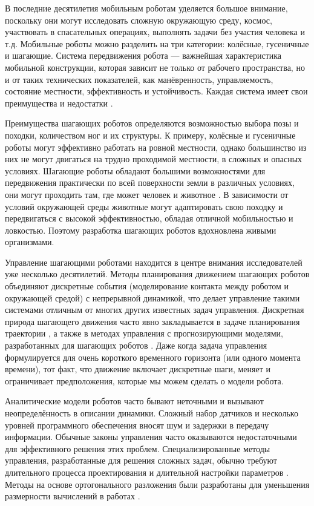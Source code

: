 {\actuality} 

В последние десятилетия мобильным роботам уделяется большое внимание, поскольку они могут исследовать сложную окружающую среду, космос, участвовать в спасательных операциях, выполнять задачи без участия человека и т.д. Мобильные роботы можно разделить на три категории: колёсные, гусеничные и шагающие. Система передвижения робота --- важнейшая характеристика мобильной конструкции, которая зависит не только от рабочего пространства, но и от таких технических показателей, как манёвренность, управляемость, состояние местности, эффективность и устойчивость. Каждая система имеет свои преимущества и недостатки \cite{zhong2019}.

Преимущества шагающих роботов определяются возможностью выбора позы и походки, количеством ног и их структуры. К примеру, колёсные и гусеничные роботы могут эффективно работать на ровной местности, однако большинство из них не могут двигаться на трудно проходимой местности, в сложных и опасных условиях. Шагающие роботы обладают большими возможностями для передвижения практически по всей поверхности земли в различных условиях, они могут проходить там, где может человек и животное \cite{Silva2012}. В зависимости от условий окружающей среды животные могут адаптировать свою походку и передвигаться с высокой эффективностью, обладая отличной мобильностью и ловкостью. Поэтому разработка шагающих роботов вдохновлена живыми организмами.

Управление шагающими роботами находится в центре внимания исследователей уже несколько десятилетий. Методы планирования движением шагающих роботов объединяют дискретные события (моделирование контакта между роботом и окружающей средой) с непрерывной динамикой, что делает управление такими системами отличным от многих других известных задач управления. Дискретная природа шагающего движения часто явно закладывается в задаче планирования траектории \cite{katayama2022whole, lu2023whole}, а также в методах управления с прогнозирующими моделями, разработанных для шагающих роботов \cite{KIM2019, chignoli2021humanoid}. Даже когда задача управления формулируется для очень короткого временного горизонта (или одного момента времени), тот факт, что движение включает дискретные шаги, меняет и ограничивает предположения, которые мы можем сделать о модели робота.

Аналитические модели роботов часто бывают неточными и вызывают неопределённость в описании динамики. Сложный набор датчиков и несколько уровней программного обеспечения вносят шум и задержки в передачу информации. Обычные законы управления часто оказываются недостаточными для эффективного решения этих проблем. Специализированные методы управления, разработанные для решения сложных задач, обычно требуют длительного процесса проектирования и длительной настройки параметров \cite{underactuated}. Методы на основе ортогонального разложения были разработаны для уменьшения размерности вычислений в работах \cite{Schur, mason2014full}.

